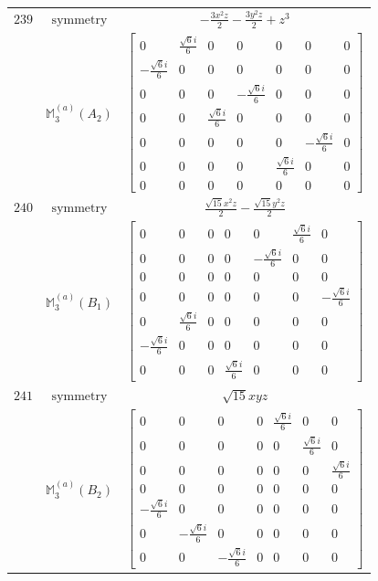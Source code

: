 \documentclass[fleqn,8pt,landscape]{jsarticle}
\begin{document}
\begin{longtable}{ccc}
$ 239 $ & $ \text{symmetry} $ & $ - \frac{3 x^{2} z}{2} - \frac{3 y^{2} z}{2} + z^{3} $ \\
$  $ & $ \mathbb{M}_{3}^{(a)}(A_{2}) $ & $ \begin{bmatrix} 0 & \frac{\sqrt{6} i}{6} & 0 & 0 & 0 & 0 & 0 \\ - \frac{\sqrt{6} i}{6} & 0 & 0 & 0 & 0 & 0 & 0 \\ 0 & 0 & 0 & - \frac{\sqrt{6} i}{6} & 0 & 0 & 0 \\ 0 & 0 & \frac{\sqrt{6} i}{6} & 0 & 0 & 0 & 0 \\ 0 & 0 & 0 & 0 & 0 & - \frac{\sqrt{6} i}{6} & 0 \\ 0 & 0 & 0 & 0 & \frac{\sqrt{6} i}{6} & 0 & 0 \\ 0 & 0 & 0 & 0 & 0 & 0 & 0 \end{bmatrix} $ \\ \hline
$ 240 $ & $ \text{symmetry} $ & $ \frac{\sqrt{15} x^{2} z}{2} - \frac{\sqrt{15} y^{2} z}{2} $ \\
$  $ & $ \mathbb{M}_{3}^{(a)}(B_{1}) $ & $ \begin{bmatrix} 0 & 0 & 0 & 0 & 0 & \frac{\sqrt{6} i}{6} & 0 \\ 0 & 0 & 0 & 0 & - \frac{\sqrt{6} i}{6} & 0 & 0 \\ 0 & 0 & 0 & 0 & 0 & 0 & 0 \\ 0 & 0 & 0 & 0 & 0 & 0 & - \frac{\sqrt{6} i}{6} \\ 0 & \frac{\sqrt{6} i}{6} & 0 & 0 & 0 & 0 & 0 \\ - \frac{\sqrt{6} i}{6} & 0 & 0 & 0 & 0 & 0 & 0 \\ 0 & 0 & 0 & \frac{\sqrt{6} i}{6} & 0 & 0 & 0 \end{bmatrix} $ \\ \hline
$ 241 $ & $ \text{symmetry} $ & $ \sqrt{15} x y z $ \\
$  $ & $ \mathbb{M}_{3}^{(a)}(B_{2}) $ & $ \begin{bmatrix} 0 & 0 & 0 & 0 & \frac{\sqrt{6} i}{6} & 0 & 0 \\ 0 & 0 & 0 & 0 & 0 & \frac{\sqrt{6} i}{6} & 0 \\ 0 & 0 & 0 & 0 & 0 & 0 & \frac{\sqrt{6} i}{6} \\ 0 & 0 & 0 & 0 & 0 & 0 & 0 \\ - \frac{\sqrt{6} i}{6} & 0 & 0 & 0 & 0 & 0 & 0 \\ 0 & - \frac{\sqrt{6} i}{6} & 0 & 0 & 0 & 0 & 0 \\ 0 & 0 & - \frac{\sqrt{6} i}{6} & 0 & 0 & 0 & 0 \end{bmatrix} $ \\ \hline

\end{longtable}
\end{document}
